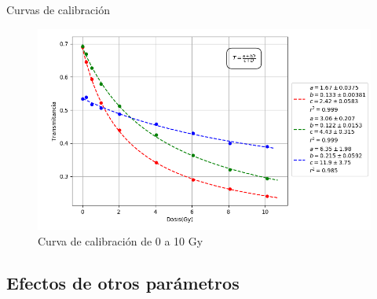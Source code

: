 \documentclass[12pt]{beamer}
\begin{document}
\begin{frame}{Curvas de calibración}
\begin{figure}
	\centering
	\includegraphics[width=0.7\linewidth]{images/calibracionMulti_2.png}
	\caption{Curva de calibración de 0 a 10 Gy}
\end{figure}
\end{frame}

\subsection{Efectos de otros parámetros}
\end{document}
